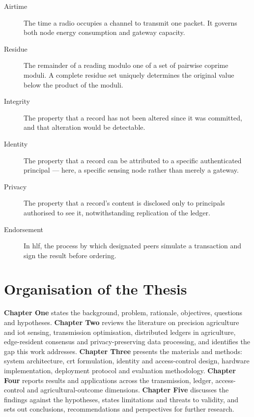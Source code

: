 \documentclass[12pt,a4paper,oneside]{book}
\begin{document}
\begin{description}
  \item[Airtime] The time a radio occupies a channel to transmit one packet. It
        governs both node energy consumption and gateway capacity.

  \item[Residue] The remainder of a reading modulo one of a set of pairwise
        coprime moduli. A complete residue set uniquely determines the original
        value below the product of the moduli.

  \item[Integrity] The property that a record has not been altered since it was
        committed, and that alteration would be detectable.

  \item[Identity] The property that a record can be attributed to a specific
        authenticated principal — here, a specific sensing node rather than
        merely a gateway.

  \item[Privacy] The property that a record's content is disclosed only to
        principals authorised to see it, notwithstanding replication of the
        ledger.

  \item[Endorsement] In \gls{hlf}, the process by which designated peers
        simulate a transaction and sign the result before ordering.
\end{description}

\section{Organisation of the Thesis}
\label{sec:organisation}

\textbf{Chapter One} states the background, problem, rationale, objectives,
questions and hypotheses. \textbf{Chapter Two} reviews the literature on
precision agriculture and \gls{iot} sensing, transmission optimisation,
distributed ledgers in agriculture, edge-resident consensus and
privacy-preserving data processing, and identifies the gap this work addresses.
\textbf{Chapter Three} presents the materials and methods: system architecture,
\gls{crt} formulation, identity and access-control design, hardware
implementation, deployment protocol and evaluation methodology.
\textbf{Chapter Four} reports results and applications across the transmission,
ledger, access-control and agricultural-outcome dimensions. \textbf{Chapter
Five} discusses the findings against the hypotheses, states limitations and
threats to validity, and sets out conclusions, recommendations and perspectives
for further research.
\clearpage{}


\backmatter

\begin{singlespace}
\printbibliography[heading=none]
\end{singlespace}
\end{document}
